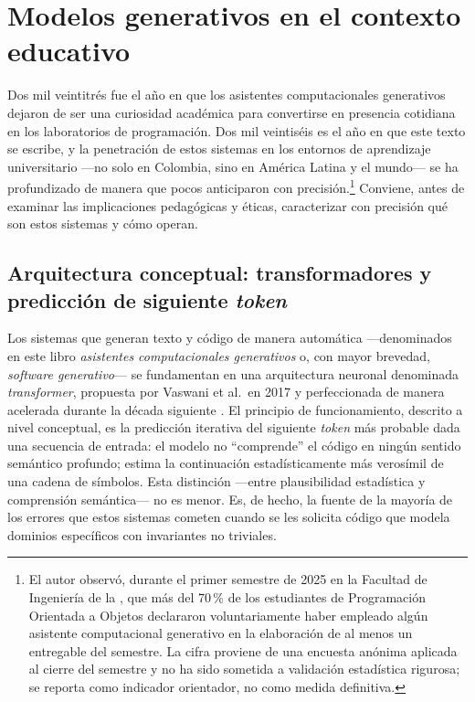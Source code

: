 \section{Modelos generativos en el contexto educativo}
\label{sec:modelos-generativos}

\noindent
Dos mil veintitrés fue el año en que los asistentes computacionales
generativos dejaron de ser una curiosidad académica para convertirse
en presencia cotidiana en los laboratorios de programación. Dos mil
veintiséis es el año en que este texto se escribe, y la penetración
de estos sistemas en los entornos de aprendizaje universitario ---no
solo en Colombia, sino en América Latina y el mundo--- se ha
profundizado de manera que pocos anticiparon con precisión.\footnote{%
  El autor observó, durante el primer semestre de 2025 en la
  Facultad de Ingeniería de la \ud, que más del 70\,\% de los
  estudiantes de Programación Orientada a Objetos declararon
  voluntariamente haber empleado algún asistente computacional
  generativo en la elaboración de al menos un entregable del semestre.
  La cifra proviene de una encuesta anónima aplicada al cierre del
  semestre y no ha sido sometida a validación estadística rigurosa;
  se reporta como indicador orientador, no como medida definitiva.}
Conviene, antes de examinar las implicaciones pedagógicas y éticas,
caracterizar con precisión qué son estos sistemas y cómo operan.

\subsection{Arquitectura conceptual: transformadores y predicción de siguiente \textit{token}}
\label{subsec:arquitectura-llm}

Los sistemas que generan texto y código de manera automática ---denominados
en este libro \emph{asistentes computacionales generativos} o, con mayor
brevedad, \emph{software generativo}--- se fundamentan en una arquitectura
neuronal denominada \textit{transformer}, propuesta por Vaswani et al.\ en 2017
y perfeccionada de manera acelerada durante la década siguiente
\parencite{Martin2017}. El principio de funcionamiento, descrito a nivel
conceptual, es la predicción iterativa del siguiente \textit{token} más probable
dada una secuencia de entrada: el modelo no ``comprende'' el código en ningún
sentido semántico profundo; estima la continuación estadísticamente más verosímil
de una cadena de símbolos. Esta distinción ---entre plausibilidad estadística y
comprensión semántica--- no es menor. Es, de hecho, la fuente de la mayoría de
los errores que estos sistemas cometen cuando se les solicita código que modela
dominios específicos con invariantes no triviales.


